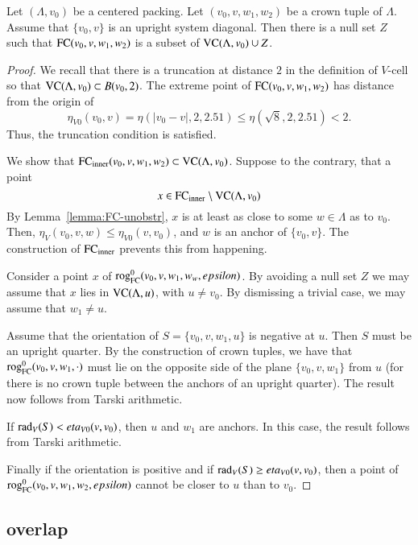\begin{lemma}  
Let $(\Lambda,v_0)$ be a centered packing.
Let $(v_0,v,w_1,w_2)$ be a crown tuple of $\Lambda$. Assume that
 $\{v_0,v\}$ is an upright system diagonal.  Then there is a null set $Z$ such
that ${\operatorname{FC}}(v_0,v,w_1,w_2)$ is
a subset of ${\operatorname{VC}}(\Lambda,v_0)\cup Z$.
\end{lemma}

\begin{proof}
We recall that there is a truncation at distance $2$ in the definition
of $V$-cell so that ${\operatorname{VC}}(\Lambda,v_0)\subset B(v_0,2)$.
The extreme point of ${\operatorname{FC}}(v_0,v,w_1,w_2)$ has distance from the origin of
 $$\eta_{V0}(v_0,v) = \eta(|v_0-v|,2,2.51)\le \eta(\sqrt8,2,2.51) < 2.$$
Thus, the truncation condition is satisfied.

We show that ${\operatorname{FC}}_{\text{inner}}(v_0,v,w_1,w_2)\subset{\operatorname{VC}}(\Lambda,v_0)$.
Suppose to the contrary, that a point 
  $$x\in {\operatorname{FC}}_{\text{inner}}\setminus {\operatorname{VC}}(\Lambda,v_0)$$
By Lemma~\ref{lemma:FC-unobstr},  $x$ is at least as close
to some $w\in\Lambda$ as to  $v_0$.  
Then, $\eta_V(v_0,v,w)\le\eta_{V0}(v,v_0)$, and $w$
is an anchor of $\{v_0,v\}$.  The construction of
${\operatorname{FC}}_{\text{inner}}$ prevents this from happening.

Consider a point $x$ of ${\operatorname{rog}}^0_{\text{FC}}(v_0,v,w_1,w_w,epsilon)$.
By avoiding a null set $Z$ we may assume that $x$ lies in
${\operatorname{VC}}(\Lambda,u)$, with $u\ne v_0$.  
By dismissing a trivial case, we may
assume that $w_1\ne u$.

Assume that the orientation of $S=\{v_0,v,w_1,u\}$ is negative at $u$.  
Then $S$ must be an upright quarter.  By
the construction of crown tuples, we have that ${\operatorname{rog}}^0_{\text{FC}}(v_0,v,w_1,\cdot)$ must
lie on the opposite side of the plane $\{v_0,v,w_1\}$ from $u$ (for
there is no crown tuple between the anchors of an upright quarter).  The
result now follows from Tarski arithmetic.

If $\operatorname{rad}_V(S) <eta_{V0}(v,v_0)$, then $u$ and $w_1$ are anchors.  In
this case, the result follows from Tarski arithmetic.

Finally if the orientation is positive and if $\operatorname{rad}_V(S)\ge
eta_{V0}(v,v_0)$, then a point of ${\operatorname{rog}}^0_{\text{FC}}(v_0,v,w_1,w_2,epsilon)$ cannot be closer to $u$ than
to $v_0$.
\end{proof}


\subsection{overlap}%
    \label{sec:overlap}


